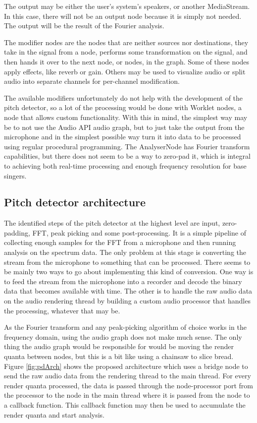 The output may be either the user's system's speakers, or another MediaStream. In this case, there will not be an output node because it is simply not needed. The output will be the result of the Fourier analysis.

The modifier nodes are the nodes that are neither sources nor destinations, they take in the signal from a node, performs some transformation on the signal, and then hands it over to the next node, or nodes, in the graph. Some of these nodes apply effects, like reverb or gain. Others may be used to visualize audio or split audio into separate channels for per-channel modification.

The available modifiers unfortunately do not help with the development of the pitch detector, so a lot of the processing would be done with Worklet nodes, a node that allows custom functionality. With this in mind, the simplest way may be to not use the Audio API audio graph, but to just take the output from the microphone and in the simplest possible way turn it into data to be processed using regular procedural programming. The AnalyserNode has Fourier transform capabilities, but there does not seem to be a way to zero-pad it, which is integral to achieving both real-time processing and enough frequency resolution for base singers. 

\subsection{Pitch detector architecture}
The identified steps of the pitch detector at the highest level are input, zero-padding, FFT, peak picking and some post-processing. It is a simple pipeline of collecting enough samples for the FFT from a microphone and then running analysis on the spectrum data. The only problem at this stage is converting the stream from the microphone to something that can be processed. There seems to be mainly two ways to go about implementing this kind of conversion. One way is to feed the stream from the microphone into a recorder and decode the binary data that becomes available with time. The other is to handle the raw audio data on the audio rendering thread by building a custom audio processor that handles the processing, whatever that may be. 

As the Fourier transform and any peak-picking algorithm of choice works in the frequency domain, using the audio graph does not make much sense. The only thing the audio graph would be responsible for would be moving the render quanta between nodes, but this is a bit like using a chainsaw to slice bread. Figure \ref{fig:pdArch} shows the proposed architecture which uses a bridge node to send the raw audio data from the rendering thread to the main thread. For every render quanta processed, the data is passed through the node-processor port from the processor to the node in the main thread where it is passed from the node to a callback function. This callback function may then be used to accumulate the render quanta and start analysis.

